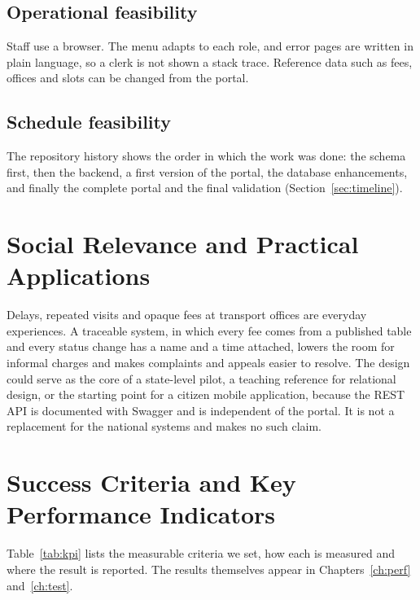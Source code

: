 \subsection{Operational feasibility}
Staff use a browser. The menu adapts to each role, and error pages are written in plain
language, so a clerk is not shown a stack trace. Reference data such as fees, offices
and slots can be changed from the portal.

\subsection{Schedule feasibility}
The repository history shows the order in which the work was done: the schema first,
then the backend, a first version of the portal, the database enhancements, and finally
the complete portal and the final validation (Section~\ref{sec:timeline}).

\section{Social Relevance and Practical Applications}
Delays, repeated visits and opaque fees at transport offices are everyday experiences.
A traceable system, in which every fee comes from a published table and every status
change has a name and a time attached, lowers the room for informal charges and makes
complaints and appeals easier to resolve. The design could serve as the core of a
state-level pilot, a teaching reference for relational design, or the starting point for
a citizen mobile application, because the REST API is documented with Swagger and is
independent of the portal. It is not a replacement for the national systems and makes
no such claim.

\section{Success Criteria and Key Performance Indicators}
Table~\ref{tab:kpi} lists the measurable criteria we set, how each is measured and
where the result is reported. The results themselves appear in Chapters~\ref{ch:perf}
and~\ref{ch:test}.

